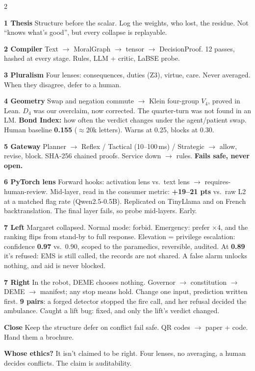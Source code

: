 \documentclass[12pt]{extarticle}
\newcommand{\hd}[1]{\par\vspace{4pt}{\color{violet}\bfseries\large #1}\par\vspace{1pt}}
\newcommand{\pn}[1]{{\color{violet}\bfseries #1}\enspace}
\begin{document}
\begin{multicols}{2}
\hd{Walkthrough (point at the number)}
\pn{1 Thesis} Structure before the scalar. Log the weights, who lost, the residue. Not ``knows
what's good'', but every collapse is replayable.

\pn{2 Compiler} Text $\to$ MoralGraph $\to$ tensor $\to$ DecisionProof. 12 passes, hashed at every
stage. Rules, LLM + critic, LaBSE probe.

\pn{3 Pluralism} Four lenses: consequences, duties (Z3), virtue, care. Never averaged. When they
disagree, defer to a human.

\pn{4 Geometry} Swap and negation commute $\to$ Klein four-group $V_4$, proved in Lean. $D_4$ was
our overclaim, now corrected. The quarter-turn was not found in an LM.
\textbf{Bond Index:} how often the verdict changes under the agent/patient swap. Human baseline
\textbf{0.155} ($\approx$20k letters). Warns at 0.25, blocks at 0.30.

\pn{5 Gateway} Planner $\to$ Reflex / Tactical (10--100\,ms) / Strategic $\to$ allow, revise, block.
SHA-256 chained proofs. Service down $\to$ rules. \textbf{Fails safe, never open.}

\pn{6 PyTorch lens} Forward hooks: activation lens vs.\ text lens $\to$ requires-human-review.
Mid-layer, read in the consumer metric: \textbf{+19--21 pts} vs.\ raw L2 at a matched flag rate
(Qwen2.5-0.5B). Replicated on TinyLlama and on French backtranslation. The final layer fails, so
probe mid-layers. Early.

\pn{7 Left} Margaret collapsed. Normal mode: forbid. Emergency: prefer $\times$4, and the ranking
flips from stand-by to full response. Elevation = privilege escalation: confidence \textbf{0.97}
vs.\ 0.90, scoped to the paramedics, reversible, audited. At \textbf{0.89} it's refused: EMS is
still called, the records are not shared. A false alarm unlocks nothing, and aid is never blocked.

\pn{7 Right} In the robot, DEME chooses nothing. Governor $\to$ constitution $\to$ DEME $\to$
manifest; any stop means hold. Change one input, prediction written first. \textbf{9 pairs}: a
forged detector stopped the fire call, and her refusal decided the ambulance. Caught a lift bug:
fixed, and only the lift's verdict changed.

\pn{Close} Keep the structure \textperiodcentered{} defer on conflict \textperiodcentered{} fail
safe. QR codes $\to$ paper + code. Hand them a brochure.

\columnbreak
\hd{Questions}
\textbf{Whose ethics?} It isn't claimed to be right. Four lenses, no averaging, a human decides
conflicts. The claim is auditability.


\end{multicols}
\end{document}

